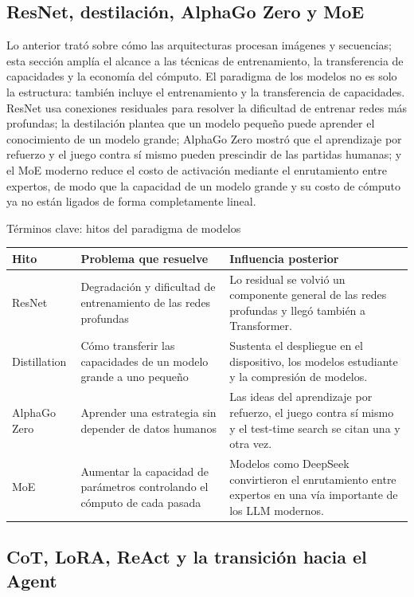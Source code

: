 \documentclass[a4paper]{article}
\begin{document}
\subsection{ResNet, destilación, AlphaGo Zero y MoE}

Lo anterior trató sobre cómo las arquitecturas procesan imágenes y secuencias; esta sección amplía el alcance a las técnicas de entrenamiento, la transferencia de capacidades y la economía del cómputo. El paradigma de los modelos no es solo la estructura: también incluye el entrenamiento y la transferencia de capacidades. ResNet usa conexiones residuales para resolver la dificultad de entrenar redes más profundas; la destilación plantea que un modelo pequeño puede aprender el conocimiento de un modelo grande; AlphaGo Zero mostró que el aprendizaje por refuerzo y el juego contra sí mismo pueden prescindir de las partidas humanas; y el MoE moderno reduce el costo de activación mediante el enrutamiento entre expertos, de modo que la capacidad de un modelo grande y su costo de cómputo ya no están ligados de forma completamente lineal.

\begin{knowledgebox}{Términos clave: hitos del paradigma de modelos}
\begin{tabularx}{\textwidth}{p{}p{}X}
\toprule
Hito & Problema que resuelve & Influencia posterior \\
\midrule
ResNet & Degradación y dificultad de entrenamiento de las redes profundas & Lo residual se volvió un componente general de las redes profundas y llegó también a Transformer. \\
Distillation & Cómo transferir las capacidades de un modelo grande a uno pequeño & Sustenta el despliegue en el dispositivo, los modelos estudiante y la compresión de modelos. \\
AlphaGo Zero & Aprender una estrategia sin depender de datos humanos & Las ideas del aprendizaje por refuerzo, el juego contra sí mismo y el test-time search se citan una y otra vez. \\
MoE & Aumentar la capacidad de parámetros controlando el cómputo de cada pasada & Modelos como DeepSeek convirtieron el enrutamiento entre expertos en una vía importante de los LLM modernos. \\
\bottomrule
\end{tabularx}
\end{knowledgebox}

\subsection{CoT, LoRA, ReAct y la transición hacia el Agent}
\end{document}
